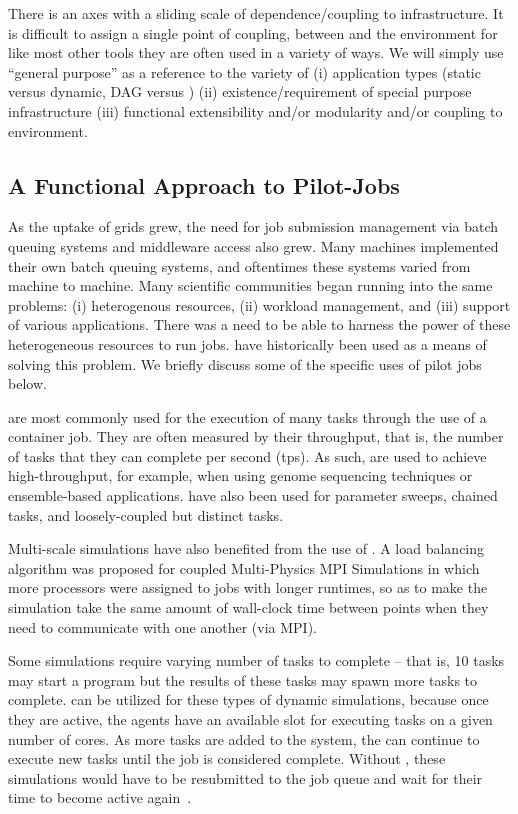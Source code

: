 \documentclass{sig-alternate}
\begin{document}
There is an axes with a sliding scale of dependence/coupling to
infrastructure.  It is difficult to assign a single point of coupling,
between \pilotjobs and the environment for like most other tools they
are often used in a variety of ways.  We will simply use ``general
purpose'' as a reference to the variety of (i) application types
(static versus dynamic, DAG versus ) 
(ii) existence/requirement of
special purpose infrastructure (iii) functional extensibility and/or
modularity and/or coupling to environment.

\subsection{A Functional Approach to Pilot-Jobs}

As the uptake of grids grew, the need for job submission management
via batch queuing systems and middleware access also grew. Many
machines implemented their own batch queuing systems, and oftentimes
these systems varied from machine to machine. Many scientific
communities began running into the same problems: (i) heterogenous
resources, (ii) workload management, and (iii) support of various
applications. There was a need to be able to
harness the power of these heterogeneous resources to run
jobs. \pilotjobs have historically been used as a means of solving
this problem. We briefly discuss some of the specific uses of pilot 
jobs below.

\pilotjobs are most commonly used for the execution of many tasks
through the use of a container job. They are often measured by
their throughput, that is, the number of tasks that they can complete
per second (tps). As such, \pilotjobs are used to achieve
high-throughput, for example, when using genome sequencing techniques
or ensemble-based applications. \pilotjobs have also been used for
parameter sweeps, chained tasks, and loosely-coupled but distinct
tasks. %

Multi-scale simulations have also benefited from the use of
\pilotjobs. A \pilotjob load balancing algorithm was proposed for
coupled Multi-Physics MPI Simulations \cite{ko-efficient} in which
more processors were assigned to jobs with longer runtimes, so as to
make the simulation take the same amount of wall-clock time between
points when they need to communicate with one another (via MPI).

Some simulations require varying number of tasks to complete -- that
is, 10 tasks may start a program but the results of these tasks may
spawn more tasks to complete. \pilotjobs can be utilized for these
types of dynamic simulations, because once they are active, the agents
have an available slot for executing tasks on a given number of
cores. As more tasks are added to the system, the \pilot can continue
to execute new tasks until the job is considered
complete. Without \pilotjobs, these simulations would have to be
resubmitted to the job queue and wait for their time to become active again~\cite{luckow2009adaptive}. 
\end{document}
